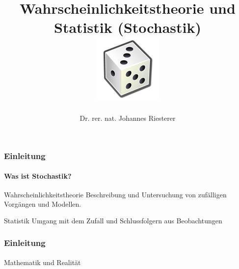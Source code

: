\documentclass{beamer}
\begin{document}
\title[Computergrafik] %
{Wahrscheinlichkeitstheorie und Statistik (Stochastik)
\\
\includegraphics[scale=0.5]{img/craps}
}
\subtitle{}
\author[Dr. Johannes Riesterer] %
{Dr.  rer. nat. Johannes Riesterer}

\date[KPT 2004] %
{}

\subject{Stochastik}

\frame{\titlepage}

\begin{frame}
    \frametitle{Einleitung}
\framesubtitle{Was ist Stochastik?}
    \begin{block}{Wahrscheinlichkeitstheorie}
 Beschreibung und Untersuchung von zufälligen Vorgängen und Modellen.
\end{block}
    \begin{block}{Statistik}
Umgang mit dem Zufall und Schlussfolgern aus Beobachtungen
\end{block}
 \end{frame}

\begin{frame}
    \frametitle{Einleitung}
\framesubtitle{}
    \begin{block}{Mathematik und Realität}


\end{block}
 
 \end{frame}
\end{document}
